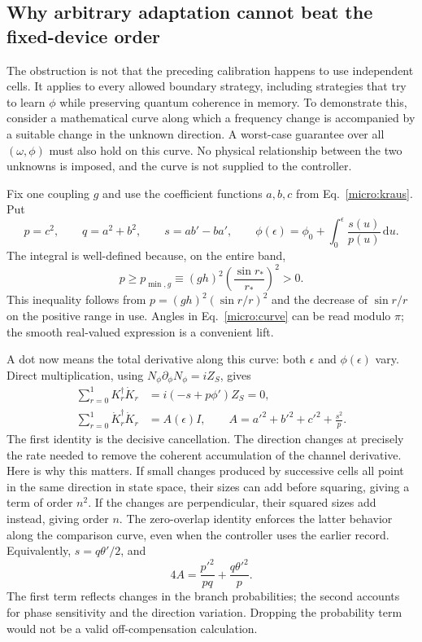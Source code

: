 \documentclass[11pt,a4paper]{article}
\numberwithin{equation}{section}
\theoremstyle{remark}
\newcommand{\dd}{\mathrm d}
\begin{document}
\subsection{Why arbitrary adaptation cannot beat the fixed-device order}
\label{micro:converse}

The obstruction is not that the preceding calibration happens to use
independent cells. It applies to every allowed boundary strategy,
including strategies that try to learn $\phi$ while preserving quantum
coherence in memory. To demonstrate this, consider a mathematical curve
along which a frequency change is accompanied by a suitable change in
the unknown direction. A worst-case guarantee over all $(\omega,\phi)$
must also hold on this curve. No physical relationship between the two
unknowns is imposed, and the curve is not supplied to the controller.

Fix one coupling $g$ and use the coefficient functions $a,b,c$ from
Eq.~\eqref{micro:kraus}. Put
\begin{equation}
 p=c^2,\qquad q=a^2+b^2,\qquad s=ab'-ba',\qquad
 \phi(\epsilon)=\phi_0+\int_0^\epsilon\frac{s(u)}{p(u)}\,\dd u.
 \label{micro:curve}
\end{equation}
The integral is well-defined because, on the entire band,
\begin{equation}
 p\ge p_{\min,g}\equiv(gh)^2
                 \left(\frac{\sin r_*}{r_*}\right)^2>0.
 \label{micro:pmin}
\end{equation}
This inequality follows from
$p=(gh)^2(\sin r/r)^2$ and the decrease of $\sin r/r$ on the
positive range in use. Angles in Eq.~\eqref{micro:curve} can be read
modulo $\pi$; the smooth real-valued expression is a convenient lift.

A dot now means the total derivative along this curve: both $\epsilon$
and $\phi(\epsilon)$ vary. Direct multiplication, using
$N_\phi\partial_\phi N_\phi=iZ_S$, gives
\begin{align}
 \sum_{r=0}^1K_r^\dagger\dot K_r
     &=i(-s+p\phi')Z_S=0,
 \label{micro:orthogonality}\\
 \sum_{r=0}^1\dot K_r^\dagger\dot K_r
     &=A(\epsilon)I,
 \qquad A=a'^2+b'^2+c'^2+\frac{s^2}{p}.
 \label{micro:A}
\end{align}
The first identity is the decisive cancellation. The direction changes
at precisely the rate needed to remove the coherent accumulation of the
channel derivative. Here is why this matters. If small changes produced by
successive cells all point in the same direction in state space, their
sizes can add before squaring, giving a term of order $n^2$. If the changes
are perpendicular, their squared sizes add instead, giving order $n$.
The zero-overlap identity enforces the latter behavior along the comparison
curve, even when the controller uses the earlier record.
Equivalently, $s=q\theta'/2$, and
\begin{equation}
 4A=\frac{p'^2}{pq}+\frac{q\theta'^2}{p}.
 \label{micro:Aequivalent}
\end{equation}
The first term reflects changes in the branch probabilities; the second
accounts for phase sensitivity and the direction variation. Dropping the
probability term would not be a valid off-compensation calculation.
\end{document}
